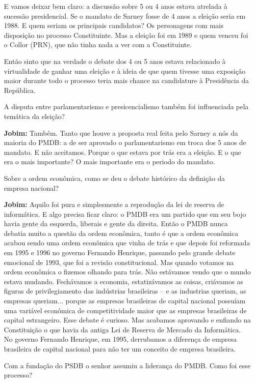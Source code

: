 E vamos deixar bem claro: a discussão sobre 5 ou 4 anos estava atrelada
à sucessão presidencial. Se o mandato de Sarney fosse de 4 anos a
eleição seria em 1988. E quem seriam os principais candidatos? Os
personagens com mais disposição no processo Constituinte. Mas a eleição
foi em 1989 e quem venceu foi o Collor (PRN), que não tinha nada a ver
com a Constituinte.

Então sinto que na verdade o debate dos 4 ou 5 anos estava relacionado à
virtualidade de ganhar uma eleição e à ideia de que quem tivesse uma
exposição maior durante todo o processo teria mais chance na candidature
à Presidência da República.

A disputa entre parlamentarismo e presicencialismo também foi
influenciada pela temática da eleição?

\textbf{Jobim:} Também. Tanto que houve a proposta real feita pelo
Sarney a nós da maioria do PMDB: a de ser aprovado o parlamentarismo em
troca dos 5 anos de mandato. E não aceitamos. Porque o que estava por
trás era a eleição. E o que era o mais importante? O mais importante era
o periodo do mandato.

Sobre a ordem econômica, como se deu o debate histórico da definição da
empresa nacional?

\textbf{Jobim:} Aquilo foi pura e simplesmente a reprodução da lei de
reserva de informática. E algo precisa ficar claro: o PMDB era um
partido que em seu bojo havia gente da esquerda, liberais e gente da
direita. Então o PMDB nunca debatia muito a questão da ordem econômica,
tanto é que a ordem econômica acabou sendo uma ordem econômica que vinha
de trás e que depois foi reformada em 1995 e 1996 no governo Fernando
Henrique, passando pelo grande debate emocional de 1993, que foi a
revisão constitucional. Mas quando votamos na ordem econômica o fizemos
olhando para trás. Não estávamos vendo que o mundo estava mudando.
Fechávamos a economia, estatizávamos as coisas, criávamos as figuras de
privilegiamento das indústrias brasileiras -- e as industrias queriam,
as empresas queriam... porque as empresas brasileiras de capital
nacional possuíam uma variável econômica de competitividade maior que as
empresas brasileiras de capital estrangeiro. Esse debate é curioso. Mas
acabamos aprovando e enfiando na Constituição o que havia da antiga Lei
de Reserva de Mercado da Informática. No governo Fernando Henrique, em
1995, derrubamos a diferença de empresa brasileira de capital nacional
para não ter um conceito de empresa brasileira.

Com a fundação do PSDB o senhor assumiu a liderança do PMDB. Como foi
esse processo?

